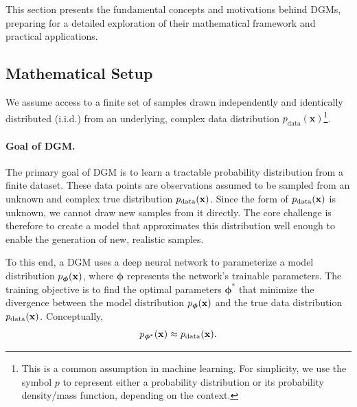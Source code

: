 

This section presents the fundamental concepts and motivations behind DGMs, preparing for a detailed exploration of their mathematical framework and practical applications.


\subsection{Mathematical Setup}\label{subsec:intro-math-setup}
We assume access to a finite set of samples drawn independently and identically distributed (i.i.d.) from an underlying, complex data distribution $ p_{\mathrm{data}}(\mathbf{x}) $\footnote{This is a common assumption in machine learning. For simplicity, we use the symbol $ p $ to represent either a probability distribution or its probability density/mass function, depending on the context.}.


\paragraph{Goal of DGM.}

The primary goal of DGM is to learn a tractable probability distribution from a finite dataset. These data points are observations assumed to be sampled from an unknown and complex true distribution $p_{\mathrm{data}}({\mathbf{x}})$. Since the form of $p_{\mathrm{data}}({\mathbf{x}})$ is unknown, we cannot draw new samples from it directly. The core challenge is therefore to create a model that approximates this distribution well enough to enable the generation of new, realistic samples.

To this end, a DGM uses a deep neural network to parameterize a model distribution $p_{\bm{\phi}}({\mathbf{x}})$, where $\bm{\phi}$ represents the network's trainable parameters. The training objective is to find the optimal parameters $\bm{\phi}^\ast$ that minimize the divergence between the model distribution $p_{\bm{\phi}}({\mathbf{x}})$ and the true data distribution $p_{\mathrm{data}}({\mathbf{x}})$. Conceptually, 
\[
p_{{\bm{\phi}}^\ast}({\mathbf{x}}) \approx p_{\mathrm{data}}({\mathbf{x}}).
\]




